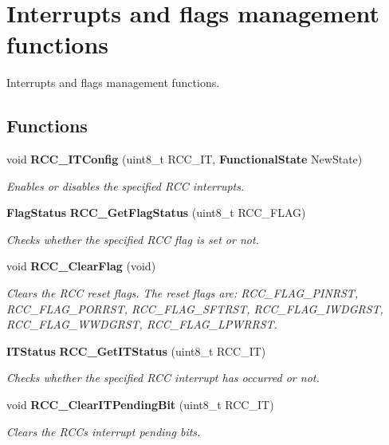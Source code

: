\section{Interrupts and flags management functions}
\label{group__RCC__Group4}


Interrupts and flags management functions.  


\subsection*{Functions}
\begin{DoxyCompactItemize}
\item 
void \textbf{ R\+C\+C\+\_\+\+I\+T\+Config} (uint8\+\_\+t R\+C\+C\+\_\+\+IT, \textbf{ Functional\+State} New\+State)
\begin{DoxyCompactList}\small\item\em Enables or disables the specified R\+CC interrupts. \end{DoxyCompactList}\item 
\textbf{ Flag\+Status} \textbf{ R\+C\+C\+\_\+\+Get\+Flag\+Status} (uint8\+\_\+t R\+C\+C\+\_\+\+F\+L\+AG)
\begin{DoxyCompactList}\small\item\em Checks whether the specified R\+CC flag is set or not. \end{DoxyCompactList}\item 
void \textbf{ R\+C\+C\+\_\+\+Clear\+Flag} (void)
\begin{DoxyCompactList}\small\item\em Clears the R\+CC reset flags. The reset flags are\+: R\+C\+C\+\_\+\+F\+L\+A\+G\+\_\+\+P\+I\+N\+R\+ST, R\+C\+C\+\_\+\+F\+L\+A\+G\+\_\+\+P\+O\+R\+R\+ST, R\+C\+C\+\_\+\+F\+L\+A\+G\+\_\+\+S\+F\+T\+R\+ST, R\+C\+C\+\_\+\+F\+L\+A\+G\+\_\+\+I\+W\+D\+G\+R\+ST, R\+C\+C\+\_\+\+F\+L\+A\+G\+\_\+\+W\+W\+D\+G\+R\+ST, R\+C\+C\+\_\+\+F\+L\+A\+G\+\_\+\+L\+P\+W\+R\+R\+ST. \end{DoxyCompactList}\item 
\textbf{ I\+T\+Status} \textbf{ R\+C\+C\+\_\+\+Get\+I\+T\+Status} (uint8\+\_\+t R\+C\+C\+\_\+\+IT)
\begin{DoxyCompactList}\small\item\em Checks whether the specified R\+CC interrupt has occurred or not. \end{DoxyCompactList}\item 
void \textbf{ R\+C\+C\+\_\+\+Clear\+I\+T\+Pending\+Bit} (uint8\+\_\+t R\+C\+C\+\_\+\+IT)
\begin{DoxyCompactList}\small\item\em Clears the R\+CC\textquotesingle{}s interrupt pending bits. \end{DoxyCompactList}\end{DoxyCompactItemize}


